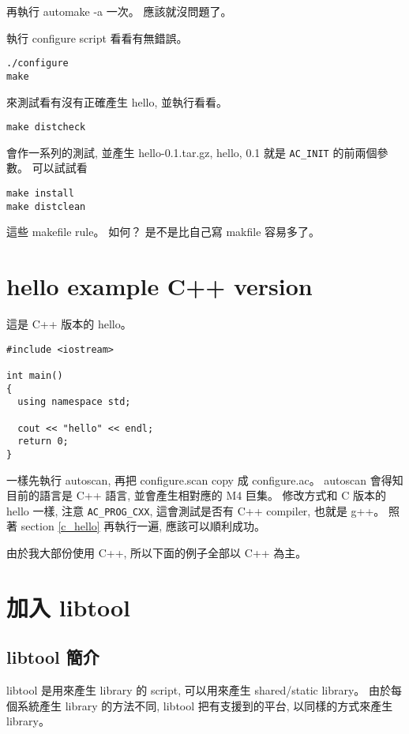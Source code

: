 \documentclass[12pt,a4]{article}
\begin{document}
\begin{CJK}{UTF8}{bsmi}
再執行 automake -a 一次。
應該就沒問題了。

執行 configure script 看看有無錯誤。

\begin{verbatim}
./configure
make
\end{verbatim}
來測試看有沒有正確產生 hello, 並執行看看。

\begin{verbatim}
make distcheck
\end{verbatim}

會作一系列的測試, 並產生 hello-0.1.tar.gz,
hello, 0.1 就是 \verb+AC_INIT+ 的前兩個參數。
可以試試看

\begin{verbatim}
make install
make distclean
\end{verbatim}

這些 makefile rule。 如何？
是不是比自己寫 makfile 容易多了。


\section{hello example C++ version}

這是 C++ 版本的 hello。

\begin{lstlisting}[frame=single,frameround=tttt,breaklines=true]
#include <iostream>

int main()
{
  using namespace std;

  cout << "hello" << endl;
  return 0;
}
\end{lstlisting}

一樣先執行 autoscan, 再把 configure.scan copy 成 configure.ac。
autoscan 會得知目前的語言是 C++ 語言, 並會產生相對應的 M4 巨集。
修改方式和 C 版本的 hello 一樣, 注意 \verb+AC_PROG_CXX+,
這會測試是否有 C++ compiler, 也就是 g++。
照著 section \ref{c_hello} 再執行一遍, 應該可以順利成功。

由於我大部份使用 C++, 所以下面的例子全部以 C++ 為主。


\section{加入 libtool}

\subsection{libtool 簡介}
libtool 是用來產生 library 的 script,
可以用來產生 shared/static library。
由於每個系統產生 library 的方法不同, libtool 把有支援到的平台,
以同樣的方式來產生 library。


\end{CJK}
\end{document}
